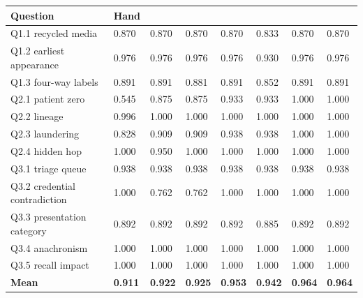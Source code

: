 \documentclass[11pt]{article}
\begin{document}
\begingroup\small
\begin{xltabular}{\linewidth}{@{}>{\raggedright\arraybackslash{}\hsize}Xlllllll@{}}
\toprule
\textbf{Question} & \textbf{Hand} & \textbf{} & \textbf{} & \textbf{} & \textbf{} & \textbf{} & \textbf{} \\
\midrule
\endhead
Q1.1 recycled media & 0.870 & 0.870 & 0.870 & 0.870 & 0.833 & 0.870 & 0.870 \\
Q1.2 earliest appearance & 0.976 & 0.976 & 0.976 & 0.976 & 0.930 & 0.976 & 0.976 \\
Q1.3 four-way labels & 0.891 & 0.891 & 0.881 & 0.891 & 0.852 & 0.891 & 0.891 \\
Q2.1 patient zero & 0.545 & 0.875 & 0.875 & 0.933 & 0.933 & 1.000 & 1.000 \\
Q2.2 lineage & 0.996 & 1.000 & 1.000 & 1.000 & 1.000 & 1.000 & 1.000 \\
Q2.3 laundering & 0.828 & 0.909 & 0.909 & 0.938 & 0.938 & 1.000 & 1.000 \\
Q2.4 hidden hop & 1.000 & 0.950 & 1.000 & 1.000 & 1.000 & 1.000 & 1.000 \\
Q3.1 triage queue & 0.938 & 0.938 & 0.938 & 0.938 & 0.938 & 0.938 & 0.938 \\
Q3.2 credential contradiction & 1.000 & 0.762 & 0.762 & 1.000 & 1.000 & 1.000 & 1.000 \\
Q3.3 presentation category & 0.892 & 0.892 & 0.892 & 0.892 & 0.885 & 0.892 & 0.892 \\
Q3.4 anachronism & 1.000 & 1.000 & 1.000 & 1.000 & 1.000 & 1.000 & 1.000 \\
Q3.5 recall impact & 1.000 & 1.000 & 1.000 & 1.000 & 1.000 & 1.000 & 1.000 \\
\textbf{Mean} & \textbf{0.911} & \textbf{0.922} & \textbf{0.925} & \textbf{0.953} & \textbf{0.942} & \textbf{0.964} & \textbf{0.964} \\
\bottomrule
\end{xltabular}
\endgroup
\end{document}
